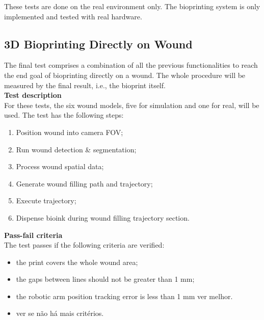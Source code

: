 These tests are done on the real environment only. The bioprinting system is only implemented and tested with real hardware.


\subsection{3D Bioprinting Directly on Wound}
\label{subsec:system_validation_tests_setup_bioprinting_directly_wound}

The final test comprises a combination of all the previous functionalities to reach the end goal of bioprinting directly on a wound. The whole procedure will be measured by the final result, i.e., the bioprint itself.\\

\textbf{Test description}\\
For these tests, the six wound models, five for simulation and one for real, will be used. The test has the following steps:

\begin{enumerate}
    \item Position wound into camera FOV;
    \item Run wound detection \& segmentation;
    \item Process wound spatial data;
    \item Generate wound filling path and trajectory;
    \item Execute trajectory;
    \item Dispense bioink during wound filling trajectory section.
\end{enumerate}

\textbf{Pass-fail criteria}\\
The test passes if the following criteria are verified:
\begin{itemize}
    \item the print covers the whole wound area;
    \item the gaps between lines should not be greater than 1 \si{\milli\meter};
    \item the robotic arm position tracking error is less than 1 \si{\milli\meter} {\color{red} ver melhor}.
    \item {\color{red} ver se não há mais critérios}.
\end{itemize}


